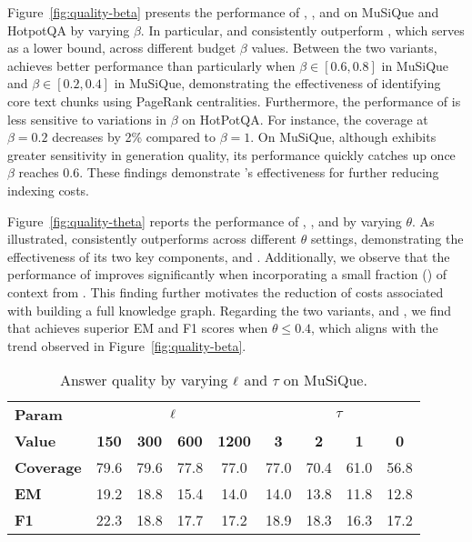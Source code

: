 Figure~\ref{fig:quality-beta} presents the performance of \sketragu, \sketragp, and \skeletonrag on MuSiQue and HotpotQA by varying $\beta$. 
In particular, \sketragp and \sketragu consistently outperform \skeletonrag, which serves as a lower bound, across different budget $\beta$ values. 
Between the two variants, \sketragp achieves better performance than \sketragu particularly when $\beta\in [0.6, 0.8]$ in MuSiQue and $\beta\in [0.2, 0.4]$ in MuSiQue, demonstrating the effectiveness of identifying core text chunks using PageRank centralities.
Furthermore, the performance of \sketrag is less sensitive to variations in $\beta$ on HotPotQA. For instance, the coverage at $\beta=0.2$ decreases by 2\% compared to $\beta=1$. On MuSiQue, although \sketrag exhibits greater sensitivity in generation quality, its performance quickly catches up once $\beta$ reaches $0.6$. These findings demonstrate \sketrag's effectiveness for further reducing indexing costs.

Figure~\ref{fig:quality-theta} reports the performance of \sketragu, \sketragp, and \hybridrag by varying $\theta$.
As illustrated, \sketrag consistently outperforms \hybridrag across different $\theta$ settings, demonstrating the effectiveness of its two key components, \keyrag and \skeletonrag.
Additionally, we observe that the performance of \keyrag improves significantly when incorporating a small fraction () of context from \kgrag. This finding further motivates the reduction of costs associated with building a full knowledge graph.
Regarding the two variants, \sketragu and \sketragp, we find that \sketragp achieves superior EM and F1 scores when $\theta \leq 0.4$, which aligns with the trend observed in Figure~\ref{fig:quality-beta}.


\begin{table}[t]
\centering
\renewcommand{\arraystretch}{1.1}
\begin{small}
\caption{Answer quality by varying $\ell$ and $\tau$ on MuSiQue.}
\label{tab:quality-clen}
\begin{tabular}{lcccc|cccc}	
    \toprule
    \bf Param & \multicolumn{4}{c}{\bf $\ell$} & \multicolumn{4}{c}{\bf $\tau$} \\
    \cmidrule(lr){2-5} \cmidrule(lr){6-9}
    \bf Value & \bf 150 & \bf 300 & \bf 600 & \bf 1200 & \bf 3 & \bf 2 & \bf 1 & \bf 0 \\
    \midrule
    \bf Coverage & 79.6 & 79.6 & 77.8 & 77.0 & 77.0 & 70.4 & 61.0 & 56.8 \\
    \bf EM & 19.2 & 18.8 & 15.4 & 14.0 & 14.0 & 13.8 & 11.8 & 12.8\\
    \bf F1 & 22.3 & 18.8 & 17.7 & 17.2 & 18.9 & 18.3 & 16.3 & 17.2\\
    \bottomrule
\end{tabular}
\end{small}
\end{table}

